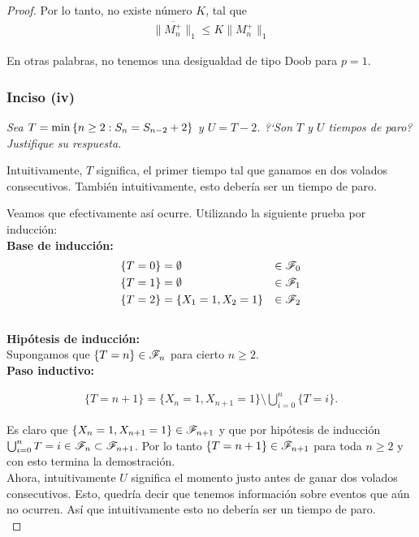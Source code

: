 \begin{proof}
		Por lo tanto, no existe número ${K}$, tal que
		\begin{align}
			 \|\overline{M_n^+}\|_1 \leq  K \|M_n^+\|_1
		\end{align}
		
		En otras palabras, no tenemos una desigualdad de tipo Doob para ${p=1}$.\\
		
	\subsubsection{Inciso (iv)}
	\emph
	{
		Sea ${T=\min\left\{ n\geq 2:S_n=S_{n-2} + 2\right\} }$ y ${U=T-2}$. ?`Son ${T}$ y ${U}$ 
		tiempos de paro? Justifique su respuesta.\\
	}
	
		Intuitivamente, ${T}$ significa, el primer tiempo tal que ganamos en dos volados consecutivos.
		También intuitivamente, esto debería ser un tiempo de paro.
		
		Veamos que efectivamente así ocurre. Utilizando la siguiente prueba por inducción:\\
		
		\textbf{Base de inducción:}		
			\begin{align}
				\{T = 0\} 		&= \emptyset  				& 	\in \mathscr{F}_0 \\
				\{T = 1\} 		&= \emptyset  				& 	\in \mathscr{F}_1 \\
				\{T = 2\} 		&= \{ X_1 = 1, X_2 = 1\} 	&	\in \mathscr{F}_2
			\end{align}	\\					
		
		\textbf{Hipótesis de inducción:}\\
		
			Supongamos que ${\{T = n\} \in \mathscr{F}_n}$ para cierto ${n \geq 2}$.\\
			
		\textbf{Paso inductivo:}
			
			\begin{align}
				\{T = n + 1 \} = \{ X_n = 1, X_{n+1} = 1\} \setminus \bigcup_{i=0}^{n} \{T = i\}.
			\end{align}				
		
			Es claro que ${\{ X_n = 1, X_{n+1} = 1\} \in \mathscr{F}_{n + 1}}$ y que por hipótesis de inducción
			${\bigcup_{i=0}^{n} {T = i} \in \mathscr{F}_n \subset \mathscr{F}_{n + 1}}$. Por lo tanto
			${\{T = n + 1 \} \in \mathscr{F}_{n+1}}$ para toda ${n \geq 2}$ y con esto termina la demostración.\\
			
		Ahora, intuitivamente ${U}$ significa el momento justo antes de ganar dos volados consecutivos.
		Esto, quedría decir que tenemos información sobre eventos que aún no ocurren. Así que intuitivamente
		esto no debería ser un tiempo de paro.\\
		

\end{proof}
